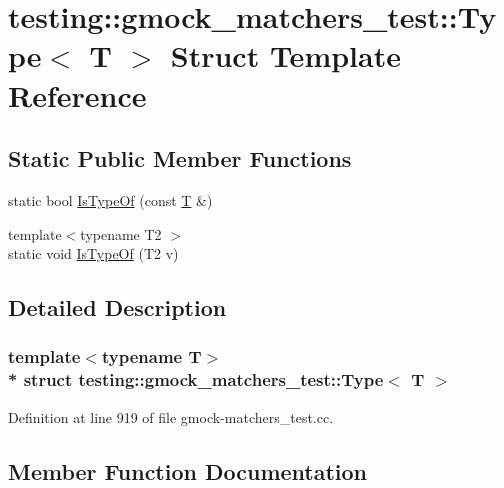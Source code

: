 \hypertarget{structtesting_1_1gmock__matchers__test_1_1_type}{}\section{testing\+:\+:gmock\+\_\+matchers\+\_\+test\+:\+:Type$<$ T $>$ Struct Template Reference}
\label{structtesting_1_1gmock__matchers__test_1_1_type}
\subsection*{Static Public Member Functions}
\begin{DoxyCompactItemize}
\item 
static bool \hyperlink{structtesting_1_1gmock__matchers__test_1_1_type_ad0b8d166a185471db49aa9009520d74f}{Is\+Type\+Of} (const \hyperlink{functions__7_8js_adf1f3edb9115acb0a1e04209b7a9937b}{T} \&)
\item 
{\footnotesize template$<$typename T2 $>$ }\\static void \hyperlink{structtesting_1_1gmock__matchers__test_1_1_type_a5451b10be4ff47bd2dc3741eb70dde59}{Is\+Type\+Of} (T2 v)
\end{DoxyCompactItemize}


\subsection{Detailed Description}
\subsubsection*{template$<$typename T$>$\\*
struct testing\+::gmock\+\_\+matchers\+\_\+test\+::\+Type$<$ T $>$}



Definition at line 919 of file gmock-\/matchers\+\_\+test.\+cc.



\subsection{Member Function Documentation}
